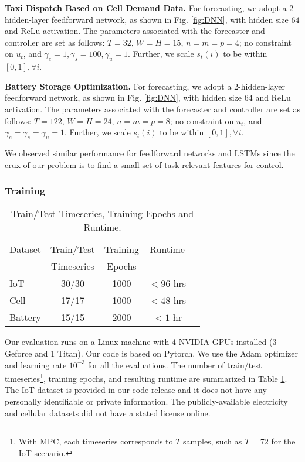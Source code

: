 \textbf{Taxi Dispatch Based on Cell Demand Data.} For forecasting, we adopt a 2-hidden-layer feedforward network, as shown in Fig. \ref{fig:DNN}, with hidden size $64$ and ReLu activation. The parameters associated with the forecaster and controller are set as follows: $T=32$, $W = H = 15$, $n = m = p = 4$; no constraint on $u_t$, and $\gamma_e = 1, \gamma_s = 100, \gamma_u = 1$. Further, we scale $s_t(i)$ to be within $[0, 1], \forall i$. 

\textbf{Battery Storage Optimization.} For forecasting, we adopt a 2-hidden-layer feedforward network, as shown in Fig. \ref{fig:DNN}, with hidden size $64$ and ReLu activation. The parameters associated with the forecaster and controller are set as follows: $T=122$, $W = H = 24$, $n = m = p = 8$; no constraint on $u_t$, and $\gamma_e = \gamma_s = \gamma_u = 1$. Further, we scale $s_t(i)$ to be within $[0, 1], \forall i$.

We observed similar performance for feedforward networks and LSTMs since the crux of our problem is to find a small set of task-relevant features for control.

\subsubsection{Training}
\begin{table}[ht]
\caption{Train/Test Timeseries, Training Epochs and Runtime.}
\label{tab:eval}
\vskip 0.15in
\begin{center}
\begin{small}
\begin{sc}
\begin{tabular}{lcccr}
\toprule
Dataset & Train/Test & Training & Runtime\\
& Timeseries & Epochs & \\
\midrule
IoT & 30/30 & 1000 & $<96$ hrs\\
Cell & 17/17 & 1000 & $<48$ hrs\\
Battery & 15/15 & 2000 & $<1$ hr \\
\bottomrule
\end{tabular}
\end{sc}
\end{small}
\end{center}
\vskip -0.1in
\end{table}

Our evaluation runs on a Linux machine with 4 NVIDIA GPUs installed (3 Geforce and 1 Titan).
Our code is based on Pytorch. We use the Adam optimizer and learning rate $10^{-3}$ for all the evaluations. The number of train/test timeseries\footnote{With MPC, each timeseries corresponds to $T$ samples, such as $T=72$ for the IoT scenario.}, training epochs, and resulting runtime are summarized in Table \ref{tab:eval}. 
The IoT dataset is provided in our code release and it does not have any personally identifiable or private information. 
The publicly-available electricity and cellular datasets did not have a stated license online. 


